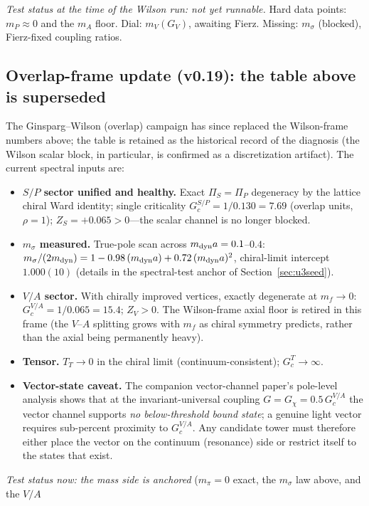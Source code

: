 \documentclass[11pt,a4paper]{article}
\begin{document}
\emph{Test status at the time of the Wilson run: not yet runnable.}
Hard data points: $m_P \approx 0$ and the $m_A$ floor.
Dial: $m_V(G_V)$, awaiting Fierz.
Missing: $m_\sigma$ (blocked), Fierz-fixed coupling ratios.

\subsection*{Overlap-frame update (v0.19): the table above is
superseded}

The Ginsparg--Wilson (overlap) campaign has since replaced the
Wilson-frame numbers above; the table is retained as the
historical record of the diagnosis (the Wilson scalar block, in
particular, is confirmed as a discretization artifact).  The
current spectral inputs are:
\begin{itemize}
\item \textbf{$S/P$ sector unified and healthy.}  Exact
$\Pi_S = \Pi_P$ degeneracy by the lattice chiral Ward identity;
single criticality $G_c^{S/P} = 1/0.130 = 7.69$ (overlap units,
$\rho = 1$); $Z_S = +0.065 > 0$---the scalar channel is no longer
blocked.
\item \textbf{$m_\sigma$ measured.}  True-pole scan across
$m_{\rm dyn} a = 0.1$--$0.4$:
$m_\sigma/(2m_{\rm dyn}) = 1 - 0.98\,(m_{\rm dyn}a)
+ 0.72\,(m_{\rm dyn}a)^2$, chiral-limit intercept $1.000(10)$
(details in the spectral-test anchor of
Section~\ref{sec:u3seed}).
\item \textbf{$V/A$ sector.}  With chirally improved vertices,
exactly degenerate at $m_f \to 0$: $G_c^{V/A} = 1/0.065 = 15.4$;
$Z_V > 0$.  The Wilson-frame axial floor is retired in this frame
(the $V$--$A$ splitting grows with $m_f$ as chiral symmetry
predicts, rather than the axial being permanently heavy).
\item \textbf{Tensor.}  $T_T \to 0$ in the chiral limit
(continuum-consistent); $G_c^T \to \infty$.
\item \textbf{Vector-state caveat.}  The companion vector-channel
paper's pole-level analysis shows that at the invariant-universal
coupling $G = G_\chi = 0.5\,G_c^{V/A}$ the vector channel supports
\emph{no below-threshold bound state}; a genuine light vector
requires sub-percent proximity to $G_c^{V/A}$.  Any candidate
tower must therefore either place the vector on the continuum
(resonance) side or restrict itself to the states that exist.
\end{itemize}
\emph{Test status now: the mass side is anchored}
($m_\pi = 0$ exact, the $m_\sigma$ law above, and the $V/A$
\end{document}

